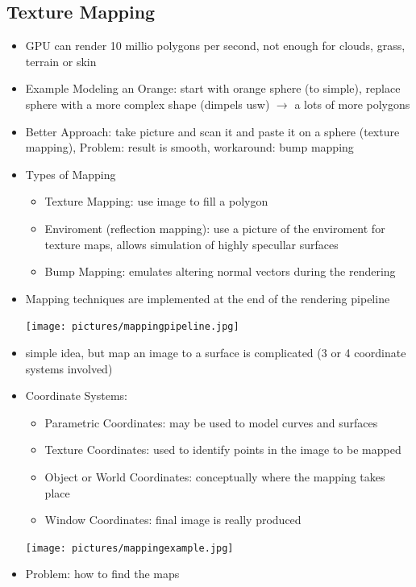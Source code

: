 \documentclass[11pt,a4paper]{article}
\begin{document}
	\subsection{Texture Mapping}
	\begin{itemize}
		\item GPU can render 10 millio polygons per second, not enough for clouds, grass, terrain or skin
		\item Example Modeling an Orange: start with orange sphere (to simple), replace sphere with a more complex shape (dimpels usw) $\rightarrow$ a lots of more polygons
		\item Better Approach: take picture and scan it and paste it on a sphere (texture mapping), Problem: result is smooth, workaround: bump mapping
		\item Types of Mapping
			\begin{itemize}
				\item Texture Mapping: use image to fill a polygon
				\item Enviroment (reflection mapping): use a picture of the enviroment for texture maps, allows simulation of highly specullar surfaces
				\item Bump Mapping: emulates altering normal vectors during the rendering
			\end{itemize}
		\item Mapping techniques are implemented at the end of the rendering pipeline
		\begin{center}
			\texttt{[image: pictures/mappingpipeline.jpg]}
		\end{center}
		\item simple idea, but map an image to a surface is complicated (3 or 4 coordinate systems involved)
		\item Coordinate Systems:
			\begin{itemize}
				\item Parametric Coordinates: may be used to model curves and surfaces
				\item Texture Coordinates: used to identify points in the image to be mapped
				\item Object or World Coordinates: conceptually where the mapping takes place
				\item Window Coordinates: final image is really produced
			\end{itemize}
		\begin{center}
			\texttt{[image: pictures/mappingexample.jpg]}
		\end{center}
		\item Problem: how to find the maps

\end{itemize}
\end{document}
